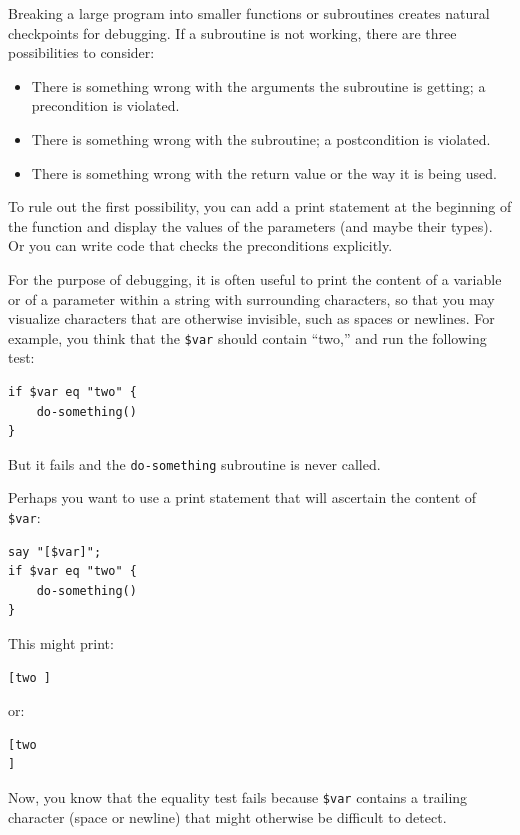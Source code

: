 Breaking a large program into smaller functions or subroutines 
creates natural checkpoints for debugging.  If a subroutine 
is not working, there are three possibilities to consider:

\begin{itemize}

\item There is something wrong with the arguments the subroutine
is getting; a precondition is violated.

\item There is something wrong with the subroutine; a postcondition
is violated.

\item There is something wrong with the return value or the
way it is being used.

\end{itemize}

To rule out the first possibility, you can add a print statement
at the beginning of the function and display the values of the
parameters (and maybe their types).  Or you can write code
that checks the preconditions explicitly.

For the purpose of debugging, it is often useful to print 
the content of a variable or of a parameter within a string 
with surrounding characters, so that you may visualize 
characters that are otherwise invisible, such as spaces or 
newlines. For example, you think that the \verb'$var' should 
contain ``two,'' and run the following test:
\begin{verbatim}
if $var eq "two" {
    do-something()
}
\end{verbatim}
%
But it fails and the {\tt do-something} subroutine is never called.

Perhaps you want to use a print statement that will ascertain 
the content of \verb'$var':
\begin{verbatim}
say "[$var]";
if $var eq "two" {
    do-something()
}
\end{verbatim}
%

This might print:
\begin{verbatim}
[two ]
\end{verbatim}
%

or:
\begin{verbatim}
[two
]
\end{verbatim}
%
Now, you know that the equality test fails because \verb'$var'
contains a trailing character (space or newline) that might otherwise 
be difficult to detect.

